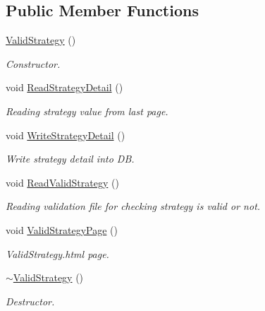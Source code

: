 \subsection*{Public Member Functions}
\begin{DoxyCompactItemize}
\item 
\hyperlink{classValidStrategy_ae168db88ebfa1eabdd7f241a631ffc27}{Valid\-Strategy} ()
\begin{DoxyCompactList}\small\item\em Constructor. \end{DoxyCompactList}\item 
void \hyperlink{classValidStrategy_ae8b17f98d81f8f70d974139086495dfa}{Read\-Strategy\-Detail} ()
\begin{DoxyCompactList}\small\item\em Reading strategy value from last page. \end{DoxyCompactList}\item 
void \hyperlink{classValidStrategy_a093620e19cef0865e6e38a26bb41b8bd}{Write\-Strategy\-Detail} ()
\begin{DoxyCompactList}\small\item\em Write strategy detail into D\-B. \end{DoxyCompactList}\item 
void \hyperlink{classValidStrategy_a234ca3ab5aa4684306148afa47b6860b}{Read\-Valid\-Strategy} ()
\begin{DoxyCompactList}\small\item\em Reading validation file for checking strategy is valid or not. \end{DoxyCompactList}\item 
void \hyperlink{classValidStrategy_ad89451a935f815b4c85b595135d70d94}{Valid\-Strategy\-Page} ()
\begin{DoxyCompactList}\small\item\em Valid\-Strategy.\-html page. \end{DoxyCompactList}\item 
\hyperlink{classValidStrategy_aec9e6ff1c9e9058a17f5488fe3e6cfec}{$\sim$\-Valid\-Strategy} ()
\begin{DoxyCompactList}\small\item\em Destructor. \end{DoxyCompactList}\end{DoxyCompactItemize}
